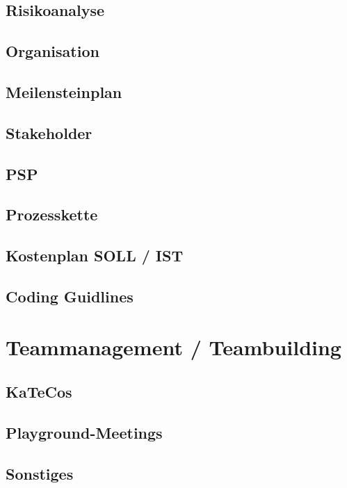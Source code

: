   \subsection{Risikoanalyse}

  \subsection{Organisation}

  \subsection{Meilensteinplan}

  \subsection{Stakeholder}

  \subsection{PSP}

  \subsection{Prozesskette}

  \subsection{Kostenplan SOLL / IST}

  \subsection{Coding Guidlines}

\section{Teammanagement / Teambuilding}

  \subsection{KaTeCos}

  \subsection{Playground-Meetings}

  \subsection{Sonstiges}
